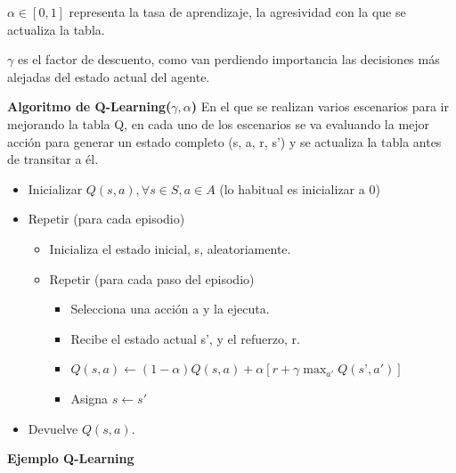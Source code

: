 \documentclass[12pt, twoside, openright]{report} %
\begin{document}
$\alpha \in [0,1]$ representa la tasa de aprendizaje, la agresividad con la que se actualiza la tabla.

$\gamma$ es el factor de descuento, como van perdiendo importancia las decisiones más alejadas del estado actual del agente.

\textbf{Algoritmo de Q-Learning($\gamma, \alpha$)}
En el que se realizan varios escenarios para ir mejorando la tabla Q, en cada uno de los escenarios se va evaluando la mejor acción para generar un estado completo (s, a, r, s') y se actualiza la tabla antes de transitar a él.
\begin{itemize}
	\item Inicializar $Q(s, a), \forall s \in S, a \in A$ (lo habitual es inicializar a 0)
	\item Repetir (para cada episodio)
	      \begin{itemize}
		      \item Inicializa el estado inicial, s, aleatoriamente.
		      \item Repetir (para cada paso del episodio)
		            \begin{itemize}
			            \item Selecciona una acción a y la ejecuta.
			            \item Recibe el estado actual s', y el refuerzo, r.
			            \item $Q(s, a) \leftarrow (1-\alpha) Q(s, a) + \alpha[r + \gamma \max_{a'} Q(s’, a')]$
			            \item Asigna $s \leftarrow s'$
		            \end{itemize}
	      \end{itemize}
	\item Devuelve $Q(s, a)$.
\end{itemize}

\textbf{Ejemplo Q-Learning}
\end{document}
